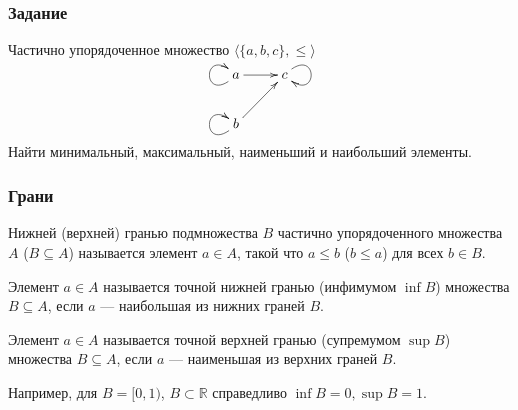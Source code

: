 \begin{frame}
    \frametitle{Задание}
    
    Частично упорядоченное множество $\langle\{a,b,c\},\leq\rangle$
    \[
        {\xymatrix{
            a \ar@{->}@(dl,ul)[] \ar@{->}[r]
                &c \ar@{->}@(ur,dr)[]
                    \\
            b  \ar@{->}@(dl,ul)[] \ar@{->}[ur]
                &*{}                 
        }}
    \]
    Найти минимальный, максимальный, наименьший и наибольший элементы.
\end{frame}    


\begin{frame}
    \frametitle{Грани}

    \begin{definition}    
        \alert{Нижней} (\alert{верхней}) гранью подмножества $B$ частично упорядоченного множества $A$ ($B\subseteq A$) называется элемент $a\in A$, такой что $a\leq b$ ($b\leq a$) для всех $b\in B$. 
    \end{definition}    

    \begin{definition}    
        Элемент $a\in A$ называется \alert{точной} нижней гранью (инфимумом $\inf{B}$) множества $B\subseteq A$, если $a$ --- \alert{наибольшая} из нижних граней $B$. 
    \end{definition}    

    \begin{definition}    
        Элемент $a\in A$ называется \alert{точной} верхней гранью (супремумом $\sup{B}$) множества $B\subseteq A$, если $a$ --- \alert{наименьшая} из верхних граней $B$. 
    \end{definition}    
    
    Например, для $B=[0,1)$, $B\subset\mathbb{R}$ справедливо $\inf{B}=0,\sup{B}=1$.
\end{frame}

